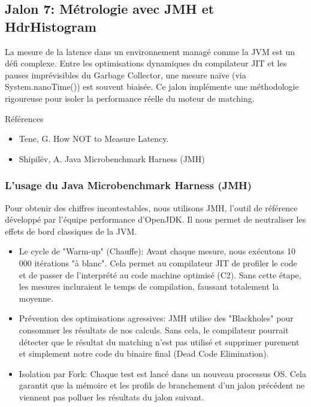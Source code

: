 \subsection{Jalon 7: Métrologie avec JMH et HdrHistogram}

La mesure de la latence dans un environnement managé comme la JVM est un défi complexe. Entre les optimisations dynamiques du compilateur JIT et les pauses imprévisibles du Garbage Collector, une mesure naïve (via System.nanoTime()) est souvent biaisée. Ce jalon implémente une méthodologie rigoureuse pour isoler la performance réelle du moteur de matching.

Références

\begin{itemize}
    \item Tene, G. How NOT to Measure Latency.
    \item Shipilëv, A. Java Microbenchmark Harness (JMH)
\end{itemize}


\subsubsection{L'usage du Java Microbenchmark Harness (JMH)}

Pour obtenir des chiffres incontestables, nous utilisons JMH, l'outil de référence développé par l'équipe performance d'OpenJDK. Il nous permet de neutraliser les effets de bord classiques de la JVM.

\begin{itemize}
    \item Le cycle de "Warm-up" (Chauffe): Avant chaque mesure, nous exécutons 10 000 itérations "à blanc". Cela permet au compilateur JIT de profiler le code et de passer de l'interprété au code machine optimisé (C2). Sans cette étape, les mesures incluraient le temps de compilation, faussant totalement la moyenne.
    \item Prévention des optimisations agressives: JMH utilise des "Blackholes" pour consommer les résultats de nos calculs. Sans cela, le compilateur pourrait détecter que le résultat du matching n'est pas utilisé et supprimer purement et simplement notre code du binaire final (Dead Code Elimination).
    \item Isolation par Fork: Chaque test est lancé dans un nouveau processus OS. Cela garantit que la mémoire et les profils de branchement d'un jalon précédent ne viennent pas polluer les résultats du jalon suivant.
\end{itemize}

